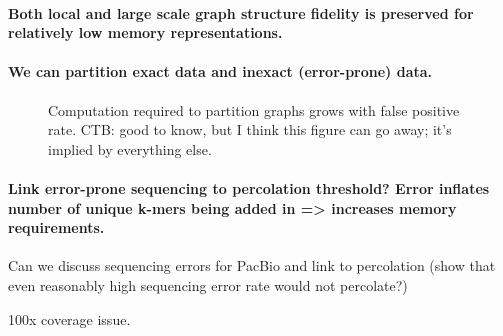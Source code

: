 \documentclass[12pt]{article} \usepackage{simplemargins}
\begin{document}
\paragraph{Both local and large scale graph structure fidelity is preserved for relatively low memory representations.}

\paragraph{We can partition exact data and inexact (error-prone) data.}

\begin{figure}
\caption{Computation required to partition graphs grows with false positive
rate.  CTB: good to know, but I think this figure can go away; it's implied
by everything else.}
\end{figure}

\paragraph{Link error-prone sequencing to percolation threshold?  Error inflates number of unique k-mers being added in => increases memory requirements.}

Can we discuss sequencing errors for PacBio and link to percolation (show
that even reasonably high sequencing error rate would not percolate?)

100x coverage issue.
\end{document}
